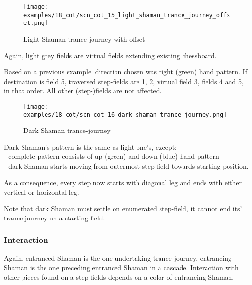 \noindent
\begin{figure}[!h]
\texttt{[image: examples/18\_cot/scn\_cot\_15\_light\_shaman\_trance\_journey\_offset.png]}
\caption{Light Shaman trance-journey with offset}
\label{fig:scn_cot_15_light_shaman_trance_journey_offset}
\end{figure}

\hyperref[fig:scn_hd_04_centaur_off_board]{Again},
light grey fields are virtual fields extending existing chessboard.

Based on a previous example, direction chosen was right (green) hand pattern.
If destination is field 5, traversed step-fields are 1, 2, virtual field 3,
fields 4 and 5, in that order. All other (step-)fields are not affected.

\clearpage %

\noindent
\begin{figure}[!h]
\texttt{[image: examples/18\_cot/scn\_cot\_16\_dark\_shaman\_trance\_journey.png]}
\caption{Dark Shaman trance-journey}
\label{fig:scn_cot_16_dark_shaman_trance_journey}
\end{figure}

Dark Shaman's pattern is the same as light one's, except: \\
- complete pattern consists of up (green) and down (blue) hand pattern \\
- dark Shaman starts moving from outermost step-field towards starting position.

As a consequence, every step now starts with diagonal leg and ends with either
vertical or horizontal leg.


Note that dark Shaman must settle on enumerated step-field, it cannot end its'
trance-journey on a starting field.

\subsubsection*{Interaction}

Again, entranced Shaman is the one undertaking trance-journey, entrancing Shaman
is the one preceding entranced Shaman in a cascade. Interaction with other pieces
found on a step-fields depends on a color of entrancing Shaman.


